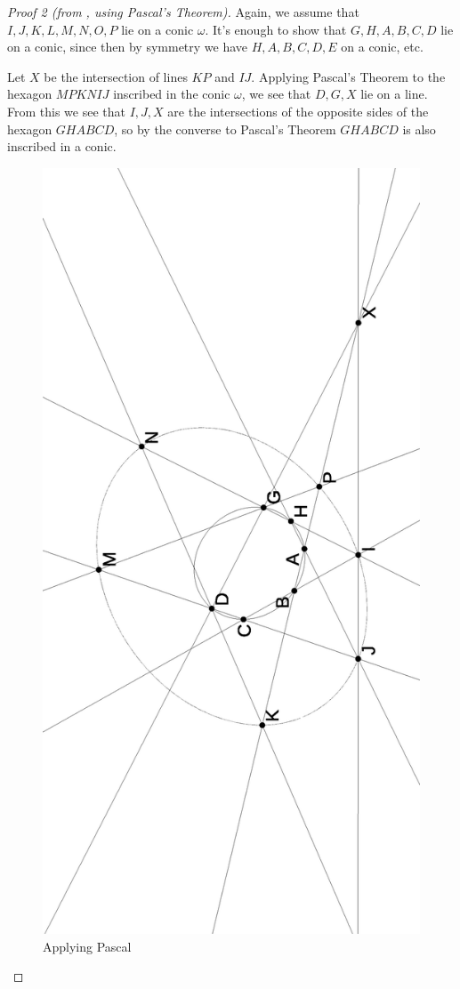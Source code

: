 \begin{proof}[Proof 2 (from \cite{mystic}, using Pascal's Theorem)] Again, we assume that $I,J,K,L,M,N,O,P$ lie on a conic $\omega$. It's enough to show that $G,H,A,B,C,D$ lie on a conic, since then by symmetry we have $H,A,B,C,D,E$ on a conic, etc.

Let $X$ be the intersection of lines $KP$ and $IJ$. Applying Pascal's Theorem to the hexagon $MPKNIJ$ inscribed in the conic $\omega$, we see that $D, G, X$ lie on a line. From this we see that $I, J, X$ are the intersections of the opposite sides of the hexagon $GHABCD$, so by the converse to Pascal's Theorem $GHABCD$ is also inscribed in a conic.
\begin{figure}[!htb]
\centering
\includegraphics[scale=0.5,angle=270]{octa2.eps}
\caption{Applying Pascal}\label{octa2}
\end{figure}
\end{proof}

